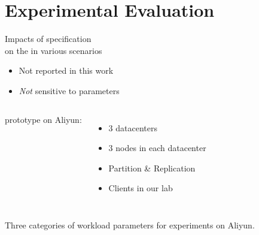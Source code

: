 \section{Experimental Evaluation}

\begin{frame}{}
  \begin{center}
    Impacts of \rvsi{} specification \\[5pt]
    on the \emph{} in various scenarios
  \end{center}

  \pause
  \vspace{0.50cm}
  \centerline{}
  \begin{itemize}
    \item Not reported in this work
    \item \emph{Not} sensitive to parameters
  \end{itemize}
\end{frame}

\begin{frame}{}
  \begin{columns}
      \chameleon{} prototype on Aliyun:
      \begin{itemize}
	\item 3 datacenters~\footnotemark[1]
	\item 3 nodes in each datacenter
	\item Partition \& Replication
	\item Clients in our lab~\footnotemark[2]
      \end{itemize}
  \end{columns}

\end{frame}

\begin{frame}{}
  \centerline{Three categories of workload parameters for experiments on Aliyun.}
  
\end{frame}


